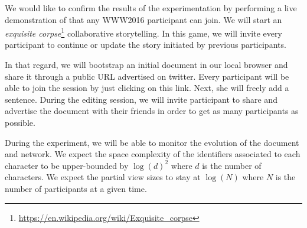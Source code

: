 We would like to confirm the results of the experimentation by performing a live
demonstration of \CRATE that any WWW2016 participant can join. We will start an
\emph{exquisite
  corpse}\footnote{\url{https://en.wikipedia.org/wiki/Exquisite_corpse}}
collaborative storytelling. In this game, we will invite every participant to
continue or update the story initiated by previous participants.

In that regard, we will bootstrap an initial document in our local browser and
share it through a public URL advertised on twitter. Every participant will be
able to join the session by just clicking on this link. Next, she will freely
add a sentence. During the editing session, we will invite participant to share
and advertise the document with their friends in order to get as many
participants as possible.

During the experiment, we will be able to monitor the evolution of the document
and network. We expect the space complexity of the identifiers associated to
each character to be upper-bounded by $\log(d)^2$ where $d$ is the number of
characters. We expect the partial view sizes to stay at $\log(N)$ where $N$ is
the number of participants at a given time.
 

